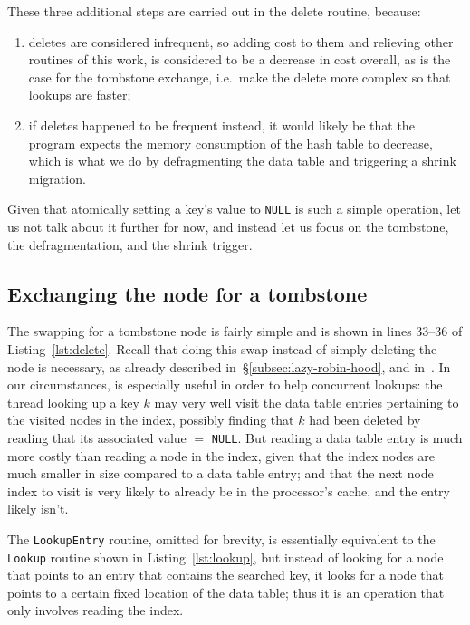 These three additional steps are carried out in the delete routine, because:
\begin{enumerate}
	\item deletes are considered infrequent, so adding cost to them and relieving other routines of this work, is considered to be a decrease in cost overall, as is the case for the tombstone exchange, i.e.\ make the delete more complex so that lookups are faster;
	\item if deletes happened to be frequent instead, it would likely be that the program expects the memory consumption of the hash table to decrease, which is what we do by defragmenting the data table and triggering a shrink migration.
\end{enumerate}

Given that atomically setting a key's value to \texttt{NULL} is such a simple operation, let us not talk about it further for now, and instead let us focus on the tombstone, the defragmentation, and the shrink trigger.


\subsection{Exchanging the node for a tombstone}\label{subsec:exchanging-node-tombstone}

The swapping for a tombstone node is fairly simple and is shown in lines 33--36 of Listing~\ref{lst:delete}.
Recall that doing this swap instead of simply deleting the node is necessary, as already described in~\S\ref{subsec:lazy-robin-hood}, and in~\cite[\S6.4]{the-art-vol-2}.
In our circumstances, is especially useful in order to help concurrent lookups: the thread looking up a key $k$ may very well visit the data table entries pertaining to the visited nodes in the index, possibly finding that $k$ had been deleted by reading that its associated value $=$ \texttt{NULL}.
But reading a data table entry is much more costly than reading a node in the index, given that the index nodes are much smaller in size compared to a data table entry; and that the next node index to visit is very likely to already be in the processor's cache, and the entry likely isn't.

The \texttt{LookupEntry} routine, omitted for brevity, is essentially equivalent to the \texttt{Lookup} routine shown in Listing~\ref{lst:lookup}, but instead of looking for a node that points to an entry that contains the searched key, it looks for a node that points to a certain fixed location of the data table; thus it is an operation that only involves reading the index.

